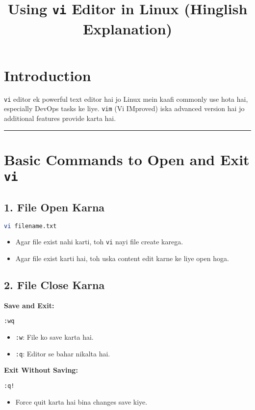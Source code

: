 \documentclass[a4paper,12pt]{article}
\title{\textbf{Using \texttt{vi} Editor in Linux (Hinglish Explanation)}}
\author{}
\date{}
\begin{document}
\maketitle
\thispagestyle{fancy}
\renewcommand{\headrulewidth}{0.4pt}

\section*{Introduction}
\texttt{vi} editor ek powerful text editor hai jo Linux mein kaafi commonly use hota hai, especially DevOps tasks ke liye. \texttt{vim} (Vi IMproved) iska advanced version hai jo additional features provide karta hai.

\hrule

\section*{Basic Commands to Open and Exit \texttt{vi}}
\subsection*{1. File Open Karna}
\begin{lstlisting}[language=bash]
vi filename.txt
\end{lstlisting}
\begin{itemize}
    \item Agar file exist nahi karti, toh \texttt{vi} nayi file create karega.
    \item Agar file exist karti hai, toh uska content edit karne ke liye open hoga.
\end{itemize}

\subsection*{2. File Close Karna}
\textbf{Save and Exit:}
\begin{lstlisting}
:wq
\end{lstlisting}
\begin{itemize}
    \item \texttt{:w}: File ko save karta hai.
    \item \texttt{:q}: Editor se bahar nikalta hai.
\end{itemize}

\textbf{Exit Without Saving:}
\begin{lstlisting}
:q!
\end{lstlisting}
\begin{itemize}
    \item Force quit karta hai bina changes save kiye.
\end{itemize}
\end{document}
